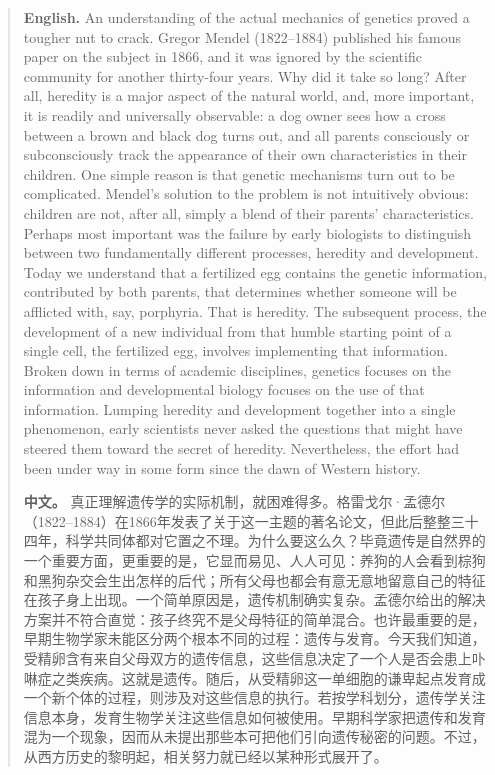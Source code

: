 \begin{quote}
\noindent\textbf{English.} An understanding of the actual mechanics of genetics proved a tougher nut to crack. Gregor Mendel (1822--1884) published his famous paper on the subject in 1866, and it was ignored by the scientific community for another thirty-four years. Why did it take so long? After all, heredity is a major aspect of the natural world, and, more important, it is readily and universally observable: a dog owner sees how a cross between a brown and black dog turns out, and all parents consciously or subconsciously track the appearance of their own characteristics in their children. One simple reason is that genetic mechanisms turn out to be complicated. Mendel's solution to the problem is not intuitively obvious: children are not, after all, simply a blend of their parents' characteristics. Perhaps most important was the failure by early biologists to distinguish between two fundamentally different processes, heredity and development. Today we understand that a fertilized egg contains the genetic information, contributed by both parents, that determines whether someone will be afflicted with, say, porphyria. That is heredity. The subsequent process, the development of a new individual from that humble starting point of a single cell, the fertilized egg, involves implementing that information. Broken down in terms of academic disciplines, genetics focuses on the information and developmental biology focuses on the use of that information. Lumping heredity and development together into a single phenomenon, early scientists never asked the questions that might have steered them toward the secret of heredity. Nevertheless, the effort had been under way in some form since the dawn of Western history.

\smallskip
\noindent\textbf{中文。} 真正理解遗传学的实际机制，就困难得多。格雷戈尔·孟德尔（1822--1884）在1866年发表了关于这一主题的著名论文，但此后整整三十四年，科学共同体都对它置之不理。为什么要这么久？毕竟遗传是自然界的一个重要方面，更重要的是，它显而易见、人人可见：养狗的人会看到棕狗和黑狗杂交会生出怎样的后代；所有父母也都会有意无意地留意自己的特征在孩子身上出现。一个简单原因是，遗传机制确实复杂。孟德尔给出的解决方案并不符合直觉：孩子终究不是父母特征的简单混合。也许最重要的是，早期生物学家未能区分两个根本不同的过程：遗传与发育。今天我们知道，受精卵含有来自父母双方的遗传信息，这些信息决定了一个人是否会患上卟啉症之类疾病。这就是遗传。随后，从受精卵这一单细胞的谦卑起点发育成一个新个体的过程，则涉及对这些信息的执行。若按学科划分，遗传学关注信息本身，发育生物学关注这些信息如何被使用。早期科学家把遗传和发育混为一个现象，因而从未提出那些本可把他们引向遗传秘密的问题。不过，从西方历史的黎明起，相关努力就已经以某种形式展开了。
\end{quote}

